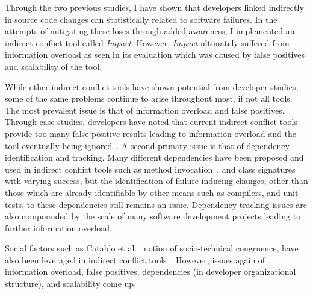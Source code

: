 Through the two previous studies, I have shown that developers linked indirectly in source code changes can statistically
related to software failures. In the attempts of mitigating these loses through added awareness, I implemented
an indirect conflict tool called \textit{Impact}. However, \textit{Impact} ultimately suffered from information
overload as seen in its evaluation which was caused by false positives and scalability of the tool.

While other indirect conflict tools have shown potential from developer studies, some of the same problems continue
to arise throughout most, if not all tools. The most prevalent issue is that of information
overload and false positives. Through case studies, developers have noted that current indirect conflict tools provide too many 
false positive results leading to information overload and the tool eventually being
ignored~\cite{Sarma:2007:TSA, Servant:2010:CPI}. A second primary issue is that of dependency identification and
tracking. Many different dependencies have been proposed and used in indirect conflict tools such as method 
invocation~\cite{Trainer:2005:BGT}, and class signatures~\cite{Sarma:2007:TSA} with varying success, but the 
identification of failure inducing changes, other than those which are already identifiable by other means such
as compilers, and unit tests, to these dependencies still remains an issue. Dependency tracking issues are
also compounded by the scale of many software development projects leading to further information overload.

Social factors such as Cataldo et al.~\cite{Cataldo:2006:ICR} notion of socio-technical
congruence, have also been leveraged in indirect conflict tools~\cite{Kwan:2011:ESC, Begel:2010:CDE, Borici:2012:CHA}.
However, issues again of information overload, false positives, dependencies (in developer organizational structure), and scalability 
come up.

